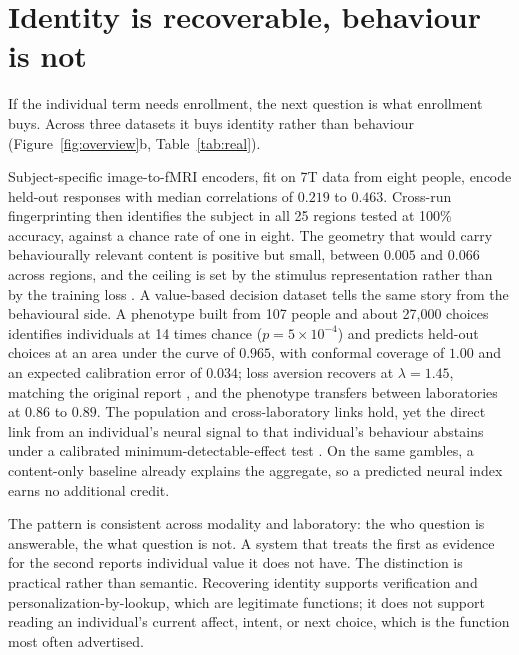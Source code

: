 \documentclass{article}
\begin{document}
\section{Identity is recoverable, behaviour is not}
\label{sec:whowhat}
If the individual term needs enrollment, the next question is what enrollment buys. Across three datasets it
buys identity rather than behaviour (Figure~\ref{fig:overview}b, Table~\ref{tab:real}).

Subject-specific image-to-fMRI encoders, fit on 7T data from eight people, encode held-out responses with
median correlations of $0.219$ to $0.463$. Cross-run fingerprinting then identifies the subject in all 25
regions tested at 100\% accuracy, against a chance rate of one in eight. The geometry that would carry
behaviourally relevant content is positive but small, between $0.005$ and $0.066$ across regions, and the
ceiling is set by the stimulus representation rather than by the training loss \citep{allen2022,chang2019}.
A value-based decision dataset tells the same story from the behavioural side. A phenotype built from 107
people and about 27{,}000 choices identifies individuals at 14 times chance ($p=5\times10^{-4}$) and predicts
held-out choices at an area under the curve of $0.965$, with conformal coverage of $1.00$ and an expected
calibration error of $0.034$; loss aversion recovers at $\lambda=1.45$, matching the original report
\citep{tom2007}, and the phenotype transfers between laboratories at $0.86$ to $0.89$. The population and
cross-laboratory links hold, yet the direct link from an individual's neural signal to that individual's
behaviour abstains under a calibrated minimum-detectable-effect test \citep{botviniknezer2019}. On the same
gambles, a content-only baseline already explains the aggregate, so a predicted neural index earns no
additional credit.

The pattern is consistent across modality and laboratory: the who question is answerable, the what question
is not. A system that treats the first as evidence for the second reports individual value it does not have.
The distinction is practical rather than semantic. Recovering identity supports verification and
personalization-by-lookup, which are legitimate functions; it does not support reading an individual's
current affect, intent, or next choice, which is the function most often advertised.
\end{document}
